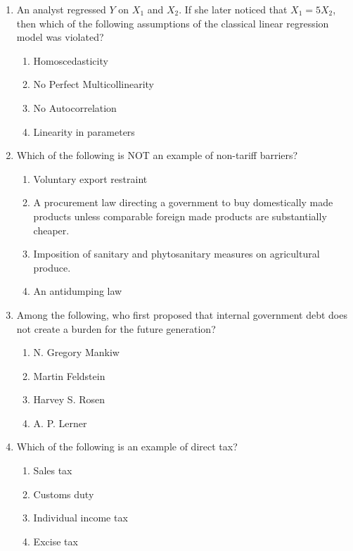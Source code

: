 \documentclass[journal,13pt,onecolumn]{exam}
\theoremstyle{remark}
\begin{document}
\begin{enumerate}[label=Q.\arabic*]
    \item An analyst regressed \( Y \) on \( X_1 \) and \( X_2 \). If she later noticed that \( X_1 = 5X_2 \), then which of the following assumptions of the classical linear regression model was violated?
    \begin{enumerate}[label=\textbf{(\Alph*)}]
        \item Homoscedasticity
        \item No Perfect Multicollinearity
        \item No Autocorrelation
        \item Linearity in parameters
    \end{enumerate}

\item Which of the following is NOT an example of non-tariff barriers?
    \begin{enumerate}[label=\textbf{(\Alph*)}]
        \item Voluntary export restraint
        \item A procurement law directing a government to buy domestically made products unless comparable foreign made products are substantially cheaper.
        \item Imposition of sanitary and phytosanitary measures on agricultural produce.
        \item An antidumping law
    \end{enumerate}

\item Among the following, who first proposed that internal government debt does not create a burden for the future generation?
    \begin{enumerate}[label=\textbf{(\Alph*)}]
        \item N. Gregory Mankiw
        \item Martin Feldstein
        \item Harvey S. Rosen
        \item A. P. Lerner
    \end{enumerate}
\item Which of the following is an example of direct tax?
    \begin{enumerate}[label=\textbf{(\Alph*)}]
        \item Sales tax
        \item Customs duty
        \item Individual income tax
        \item Excise tax
    \end{enumerate}


\end{enumerate}
\end{document}
